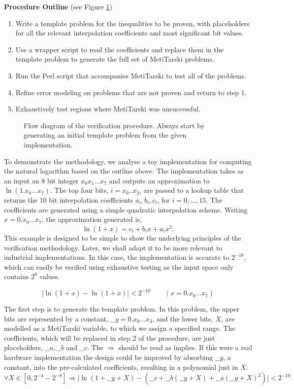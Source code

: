 \documentclass{fac}
\newcommand{\abs}[1]{\lvert#1\rvert}
\begin{document}
\noindent\textbf{Procedure Outline} (see Figure \ref{procedure_flow})
\begin{enumerate}
\item Write a template problem for the inequalities to be proven, with placeholders for all the relevant interpolation coefficients and most significant bit values.
\item Use a wrapper script to read the coefficients and replace them in the template problem to generate the full set of MetiTarski problems.
\item Run the Perl script that accompanies MetiTarski to test all of the problems.
\item Refine error modeling on problems that are not proven and return to step 1.
\item Exhaustively test regions where MetiTarski was unsuccessful.
\end{enumerate}  

\begin{figure} 
\centering

\caption{Flow diagram of the verification procedure. Always start by generating an initial template problem from the given implementation.}
\label{procedure_flow}
\end{figure}

To demonstrate the methodology, we analyse a toy implementation for computing the natural logarithm based on the outline above. The implementation takes as an input an 8 bit integer $x_0x_1...x_7$ and outputs an approximation to $\ln(1.x_0...x_7)$. The top four bits, $i = x_0..x_3$, are passed to a lookup table that returns the 10 bit interpolation coefficients $a_i, b_i, c_i$, for $i=0,...,15$. The coefficients are generated using a simple quadratic interpolation scheme. Writing $x=0.x_0...x_7$, the approximation generated is,
\[ \overline{\ln(1+x)}=c_i + b_i x +a_i x^2. \]
This example is designed to be simple to show the underlying principles of the verification methodology. Later, we shall adapt it to be more relevant to industrial implementations. In this case, the implementation is accurate to $2^{-10}$, which can easily be verified using exhaustive testing as the input space only contains $2^8$ values.

\[\abs{\ln(1+x)-\overline{\ln(1+x)}} <2^{-10} \qquad (x= 0.x_0...x_7) \]

The first step is to generate the template problem. In this problem, the upper bits are represented by a constant, $\_\_y=0.x_0...x_3$, and the lower bits, $X$, are modelled as a MetiTarski variable, to which we assign a specified range. The coefficients, which will be replaced in step 2 of the procedure, are just placeholders, $\_\_a, \_\_b$ and $\_\_c$. The $\Rightarrow$ should be read as implies. If this were a real hardware implementation the design could be improved by absorbing $\_\_y$, a constant, into the pre-calculated coefficients, resulting in a polynomial just in $X$.
\[ \forall X \in [0, 2^{-4}-2^{-8}] \Rightarrow \abs{\ln(1+\_\_y+X)-(\_\_c+\_\_b(\_\_y+X)+\_\_a(\_\_y+X)^2)} < 2^{-10} \]
\end{document}

